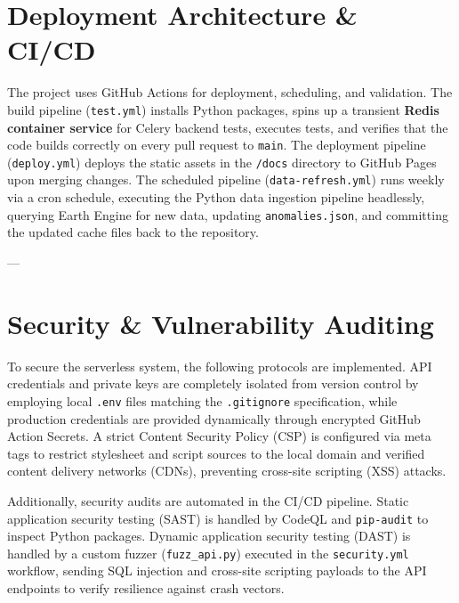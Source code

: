 \section{Deployment Architecture \& CI/CD}
The project uses GitHub Actions for deployment, scheduling, and validation. The build pipeline (\texttt{test.yml}) installs Python packages, spins up a transient \textbf{Redis container service} for Celery backend tests, executes tests, and verifies that the code builds correctly on every pull request to \texttt{main}. The deployment pipeline (\texttt{deploy.yml}) deploys the static assets in the \texttt{/docs} directory to GitHub Pages upon merging changes. The scheduled pipeline (\texttt{data-refresh.yml}) runs weekly via a cron schedule, executing the Python data ingestion pipeline headlessly, querying Earth Engine for new data, updating \texttt{anomalies.json}, and committing the updated cache files back to the repository.

---

\section{Security \& Vulnerability Auditing}
To secure the serverless system, the following protocols are implemented. API credentials and private keys are completely isolated from version control by employing local \texttt{.env} files matching the \texttt{.gitignore} specification, while production credentials are provided dynamically through encrypted GitHub Action Secrets. A strict Content Security Policy (CSP) is configured via meta tags to restrict stylesheet and script sources to the local domain and verified content delivery networks (CDNs), preventing cross-site scripting (XSS) attacks. 

Additionally, security audits are automated in the CI/CD pipeline. Static application security testing (SAST) is handled by CodeQL and \texttt{pip-audit} to inspect Python packages. Dynamic application security testing (DAST) is handled by a custom fuzzer (\texttt{fuzz\_api.py}) executed in the \texttt{security.yml} workflow, sending SQL injection and cross-site scripting payloads to the API endpoints to verify resilience against crash vectors.
